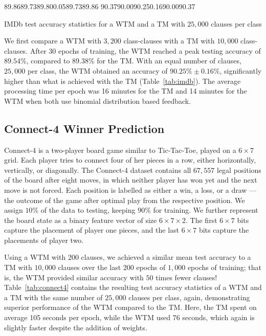 \documentclass[letterpaper]{article}
\begin{document}
\begin{table}[!ht]
\centering
\tableit
{89.86}{89.73}{89.80}{0.05}{89.73}{89.86}
{90.37}{90.00}{90.25}{0.16}{90.00}{90.37}
\caption{IMDb test accuracy statistics for a WTM and a TM with $25{,}000$ clauses per class}
\label{tab:imdb}
\end{table}

We first compare a WTM with $3{,}200$ class-clauses with a TM with $10{,}000$ class-clauses. After 30 epochs of training, the WTM reached a peak testing accuracy of $89.54$\%, compared to $89.38$\% for the TM.
With an equal number of clauses, $25{,}000$ per class, the WTM obtained an accuracy of $90.25\%\pm0.16\%$, significantly higher than what is achieved with the TM (Table~\ref{tab:imdb}). The average processing time per epoch was 16 minutes for the TM and 14 minutes for the WTM when both use binomial distribution based feedback.







\subsection{Connect-4 Winner Prediction}
\label{section:connect-4}
Connect-4 is a two-player board game similar to Tic-Tac-Toe, played on a $6\times7$ grid. Each player tries to connect four of her pieces in a row, either horizontally, vertically, or diagonally. The Connect-4 dataset \cite{Dua:2019} contains all $67{,}557$ legal positions of the board after eight moves, in which neither player has won yet and the next move is not forced. Each position is labelled as either a win, a loss, or a draw --- the outcome of the game after optimal play from the respective position. We assign $10\%$ of the data to testing, keeping $90\%$ for training. We further represent the board state as a binary feature vector of size $6\times7\times2$. The first $6\times7$ bits capture the placement of player one pieces, and the last $6\times7$ bits capture the placements of player two.

Using a WTM with $200$ clauses, we achieved a similar mean test accuracy to a TM with $10{,}000$ clauses over the last $200$ epochs of $1{,}000$ epochs of training; that is, 
the WTM provided similar accuracy with $50$ times fewer clauses! Table~\ref{tab:connect4} contains the resulting test accuracy statistics of a WTM and a TM with the same number of $25{,}000$ clauses per class, again, demonstrating superior performance of the WTM compared to the TM. Here, the TM spent on average 105 seconds per epoch, while the WTM used 76 seconds, which again is slightly faster despite the addition of weights.
\end{document}
